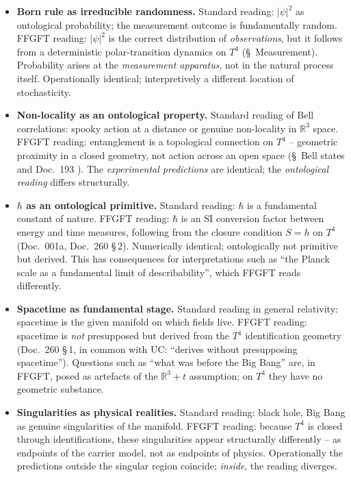 \begin{itemize}[leftmargin=2em,itemsep=4pt,topsep=4pt]
  \item \textbf{Born rule as irreducible randomness.}
        Standard reading: $|\psi|^2$ as ontological probability; the
        measurement outcome is fundamentally random. FFGFT reading:
        $|\psi|^2$ is the correct distribution of \emph{observations},
        but it follows from a deterministic polar-transition dynamics
        on $T^4$ (§~Measurement). Probability arises at the
        \emph{measurement apparatus}, not in the natural process
        itself. Operationally identical; interpretively a different
        location of stochasticity.

  \item \textbf{Non-locality as an ontological property.}
        Standard reading of Bell correlations: spooky action at a
        distance or genuine non-locality in $\mathbb{R}^3$ space.
        FFGFT reading: entanglement is a topological connection on
        $T^4$ -- geometric proximity in a closed geometry, not action
        across an open space (§~Bell states and
        Doc.~193 \cite{pascher_nonclosure_2026}). The
        \emph{experimental predictions} are identical; the
        \emph{ontological reading} differs structurally.

  \item \textbf{$\hbar$ as an ontological primitive.}
        Standard reading: $\hbar$ is a fundamental constant of nature.
        FFGFT reading: $\hbar$ is an SI conversion factor between
        energy and time measures, following from the closure condition
        $S=h$ on $T^4$ (Doc.~001a, Doc.~260 §\,2). Numerically
        identical; ontologically not primitive but derived. This has
        consequences for interpretations such as ``the Planck scale as
        a fundamental limit of describability'', which FFGFT reads
        differently.

  \item \textbf{Spacetime as fundamental stage.}
        Standard reading in general relativity: spacetime is the given
        manifold on which fields live. FFGFT reading: spacetime is
        \emph{not} presupposed but derived from the $T^4$
        identification geometry (Doc.~260 §\,1, in common with UC:
        ``derives without presupposing spacetime''). Questions such as
        ``what was before the Big Bang'' are, in FFGFT, posed as
        artefacts of the $\mathbb{R}^3 + t$ assumption; on $T^4$ they
        have no geometric substance.

  \item \textbf{Singularities as physical realities.}
        Standard reading: black hole, Big Bang as genuine
        singularities of the manifold. FFGFT reading: because $T^4$
        is closed through identifications, these singularities appear
        structurally differently -- as endpoints of the carrier model,
        not as endpoints of physics. Operationally the predictions
        outside the singular region coincide; \emph{inside}, the
        reading diverges.
\end{itemize}

